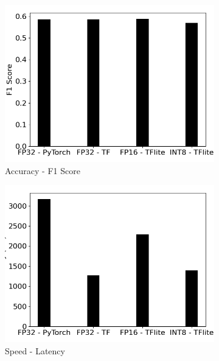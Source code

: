 \begin{figure}[]
    \centering
    \begin{subfigure}{0.19\textwidth}
        \includegraphics[width=1\textwidth]{other/figures/YOLOv5s_COCO_RasPi/rasPI_f1score_v2.png}
        \caption{Accuracy - F1 Score}
    \end{subfigure}
    \begin{subfigure}{0.19\textwidth}
        \includegraphics[width=1\textwidth]{other/figures/YOLOv5s_COCO_RasPi/rasPI_latency_v2.png}
        \caption{Speed - Latency}
    \end{subfigure}
    \begin{subfigure}{0.19\textwidth}

\end{subfigure}
\end{figure}
